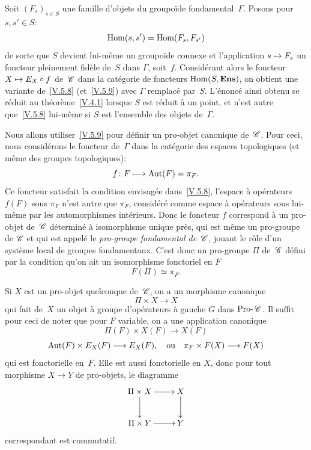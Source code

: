 \begin{remarque}
\label{V.5.10}
Soit $(F_s)_{s\in S}$ une famille
d'objets
du groupo\"ide fondamental~$\Gamma$. Posons pour $s, s'\in S$:
$$
\operatorname{Hom}(s, s')=\operatorname{Hom}(F_s, F_{s'})
$$
de sorte que $S$ devient lui-m\^eme un groupo\"ide connexe et
l'application $s\mto F_s$ un foncteur pleinement fid\`ele de~$S$
dans $\Gamma$, soit~$f$. Consid\'erant alors le foncteur $X\mto
E_X\circ f$ de~$\cal{C}$ dans la cat\'egorie de foncteurs
$\operatorname{Hom}(S,\mathbf{Ens})$, on obtient une variante de~\ref{V.5.8}
(et~\ref{V.5.9}) avec $\Gamma$ remplac\'e par~$S$. L'\'enonc\'e
ainsi obtenu se r\'eduit au th\'eor\`eme~\ref{V.4.1} lorsque $S$
est r\'eduit \`a un point, et n'est autre que~\ref{V.5.8}
lui-m\^eme si $S$ est l'ensemble des objets de~$\Gamma$.
\end{remarque}

Nous allons utiliser~\ref{V.5.9} pour d\'efinir un pro-objet
canonique de~$\cal{C}$. Pour ceci, nous consid\'erons le foncteur
de~$\Gamma$ dans la cat\'egorie des espaces topologiques
(et m\^eme des groupes topologiques):
$$
f\colon F\mto \Aut(F)=\pi_F.
$$
Ce foncteur satisfait la condition envisag\'ee dans~\ref{V.5.8},
l'espace \`a op\'erateurs $f(F)$ sous $\pi_F$ n'est autre que
$\pi_F$, consid\'er\'e comme espace \`a op\'erateurs sous
lui-m\^eme par les automorphismes int\'erieurs. Donc le foncteur
$f$ correspond \`a un pro-objet de~$\cal{C}$ d\'etermin\'e \`a
isomorphisme unique pr\`es, qui est m\^eme un pro-groupe de
$\cal{C}$ et qui est appel\'e le \emph{pro-groupe fondamental
de~${\cal C}$},
jouant le r\^ole d'un syst\`eme local de groupes
fondamentaux. C'est donc un pro-groupe $\Pi$ de~$\cal{C}$ d\'efini
par la condition qu'on ait un isomorphisme fonctoriel en $F$
$$
F(\Pi)\simeq\pi_F.
$$

Si $X$ est un pro-objet quelconque de~$\cal{C}$, on a un morphisme
canonique
$$
\Pi\times X \to X
$$
qui fait de~$X$ un objet \`a groupe d'op\'erateurs \`a gauche
$G$ dans $\Prodash\cal{C}$. Il suffit pour ceci de noter que pour $F$
variable, on a une application canonique
$$
\Pi(F)\times X(F) \to X(F)
$$
\ie $$
\Aut(F)\times E_X(F) \to E_X(F), \quad \text{ou} \quad \pi_F\times
F(X)\to F(X)
$$
qui est fonctorielle en~$F$. Elle est aussi fonctorielle en $X$, donc
pour tout morphisme $X\to Y$ de pro-objets, le diagramme
$$
\xymatrix{{\Pi \times X}\ar[r]\ar[d]&{X}\ar[d]\\{\Pi \times Y}\ar[r]&{Y}}
$$
correspondant est commutatif.

